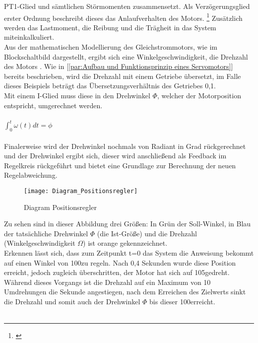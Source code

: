 \documentclass[titlepage,12pt,twoside]{article}
\begin{document}
PT1-Glied und sämtlichen Störmomenten zusammensetzt. Als Verzögerungsglied erster 
Ordnung beschreibt dieses das Anlaufverhalten des Motors. \footnote{\cite{Q12}} Zusätzlich werden 
das Lastmoment, die Reibung und die Trägheit in das System miteinkalkuliert. \\
Aus der mathematischen Modellierung des Gleichstrommotors, wie im Blockschaltbild 
dargestellt, ergibt sich eine Winkelgeschwindigkeit, die Drehzahl des Motors \textquote{$\Omega$}.
Wie in [\textcolor{blue}{\autoref{par:Aufbau und Funktionsprinzip eines Servomotors}}] 
bereits beschrieben, wird die Drehzahl mit einem Getriebe übersetzt, im Falle dieses 
Beispiels beträgt das Übersetzungsverhältnis des Getriebes 0,1. \\
Mit einem I-Glied muss diese in den Drehwinkel $\Phi$, welcher der Motorposition 
entspricht, umgerechnet werden. \\
\\
$\int_{0}^{t} \omega(t)dt = \phi$ \\
\\
Finalerweise wird der Drehwinkel nochmals von Radiant in Grad rückgerechnet und der 
Drehwinkel ergibt sich, dieser wird anschließend als Feedback im Regelkreis 
rückgeführt und bietet eine Grundlage zur Berechnung der neuen Regelabweichung. \\
\begin{figure}[H]
	\begin{center}
		\scalebox{1.2}
		{\texttt{[image: Diagram\_Positionsregler]}}
		\caption{Diagram Positionsregler}
		\label{fig:Diagram_Poositionsregler}
	\end{center}
\end{figure}
\hfill \break
Zu sehen sind in dieser Abbildung drei Größen: In Grün der Soll-Winkel, in Blau der 
tatsächliche Drehwinkel $\Phi$ (die Ist-Größe) und die Drehzahl (Winkelgeschwindigkeit 
$\Omega$) ist orange gekennzeichnet. \\
Erkennen lässt sich, dass zum Zeitpunkt t=0 das System die Anweisung bekommt auf 
einen Winkel von 100\textdegree zu regeln. Nach 0,4 Sekunden wurde diese Position erreicht, 
jedoch zugleich überschritten, der Motor hat sich auf 105\textdegree gedreht. Während dieses 
Vorgangs ist die Drehzahl auf ein Maximum von 10 Umdrehungen die Sekunde angestiegen, nach dem 
Erreichen des Zielwerts sinkt die Drehzahl und somit auch der Drehwinkel $\Phi$ bis 
dieser 100\textdegree erreicht. \\
\\
\end{document}
